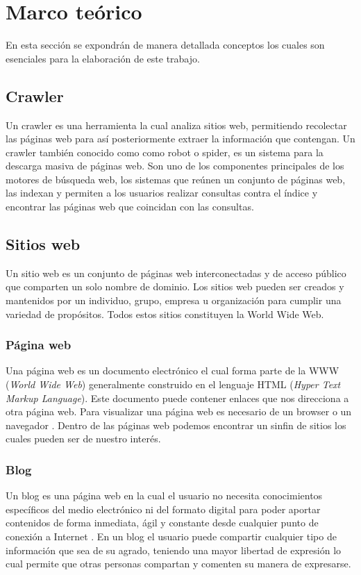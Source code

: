 
\chapter{Marco teórico}

En esta sección se expondrán de manera detallada conceptos los cuales son esenciales para la elaboración de este trabajo.


\section{Crawler}
Un crawler \cite{once} es una herramienta la cual analiza sitios web, permitiendo recolectar las páginas web para así posteriormente extraer la información que contengan. Un crawler también conocido como como robot o spider, es un sistema para la descarga masiva de páginas web. Son uno de los componentes principales de los motores de búsqueda web, los sistemas que reúnen un conjunto de páginas web, las indexan y permiten a los usuarios realizar consultas contra el índice y encontrar las páginas web que coincidan con las consultas.


\section{Sitios web}
Un sitio web \cite{doce} es un conjunto de páginas web interconectadas y de acceso público que comparten un solo nombre de dominio. Los sitios web pueden ser creados y mantenidos por un individuo, grupo, empresa u organización para cumplir una variedad de propósitos. Todos estos sitios constituyen la World Wide Web. 

\subsection{Página web}
Una página web es un documento electrónico el cual forma parte de la WWW (\textit{World Wide Web}) generalmente construido en el lenguaje HTML (\textit{Hyper Text Markup Language}). Este documento puede contener enlaces que nos direcciona a otra página web. Para visualizar una página web es necesario de un browser o un navegador \cite{trece}. Dentro de las páginas web podemos encontrar un sinfin de sitios los cuales pueden ser de nuestro interés.

\subsection{Blog}
Un blog es una página web en la cual el usuario no necesita conocimientos específicos del medio electrónico ni del formato digital para poder aportar contenidos de forma inmediata, ágil y constante desde cualquier punto de conexión a Internet \cite{catorce}. En un blog el usuario puede compartir cualquier tipo de información que sea de su agrado, teniendo una mayor libertad de expresión lo cual permite que otras personas compartan y comenten su manera de expresarse.

